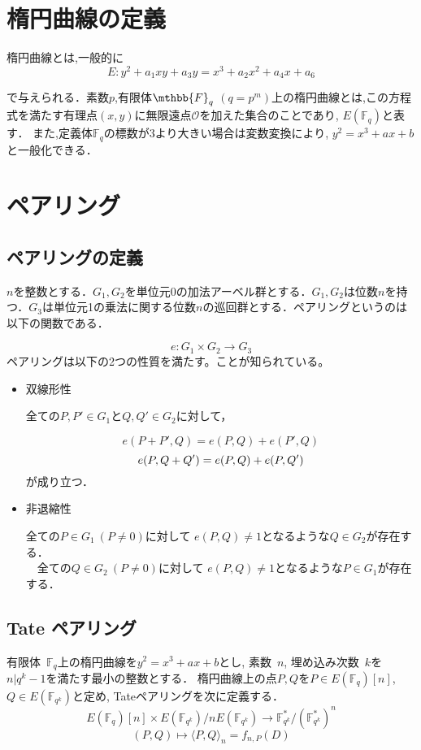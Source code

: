 \documentclass[twocolumn]{jsarticle} %
\begin{document}
\section{楕円曲線の定義}
楕円曲線とは,一般的に
\vspace{-2mm}
\[
E:y^2+a_1xy+a_3y=x^3+a_2x^2+a_4x+a_6
\]

で与えられる．素数$p$,有限体$\mthbb {F}_q$ $(q=p^m)$上の楕円曲線とは,この方程式を満たす有理点$(x,y)$に無限遠点$\mathcal{O}$を加えた集合のことであり, $E(\mathbb {F}_q)$と表す． また,定義体$\mathbb {F}_q$の標数が3より大きい場合は変数変換により, $y^2=x^3+ax+b$と一般化できる．
\section{ペアリング}

\subsection{ペアリングの定義}
$n$を整数とする．$G_1,G_2$を単位元0の加法アーベル群とする．$G_1,G_2$は位数$n$を持つ．$G_3$は単位元1の乗法に関する位数$n$の巡回群とする．ペアリングというのは以下の関数である．

\[
e:G_1\times G_2\longrightarrow G_3
\]
ペアリングは以下の2つの性質を満たす。ことが知られている。\\
\begin{itemize}
\item 双線形性

全ての$P,P' \in G_{1}$と$Q,Q' \in G_{2}$に対して，

\[
e(P+P',Q) = e(P,Q) + e(P',Q)
\]
\[
e(P,Q+Q') = e(P,Q) + e(P,Q') \\
\]
が成り立つ．\\
\vspace{-1zh}
\item 非退縮性

全ての$P \in G_{1} \ (P \not= 0)$に対して $e(P,Q) \not= 1$となるような$Q \in G_{2}$が存在する．\\
　全ての$Q \in G_{2} \ (P \not= 0)$に対して $e(P,Q) \not= 1$となるような$P \in G_{1}$が存在する．
\end{itemize}

\subsection{Tate ペアリング}
有限体\ $\mathbb{F}_q$上の楕円曲線を$y^2=x^3+ax+b$とし, 素数\ $n$, 埋め込み次数\ $k$を$n|q^k-1$を満たす最小の整数とする． 楕円曲線上の点$P,Q$を$P\in E(\mathbb{F}_q)[n]$,\ $Q\in E(\mathbb{F}_{q^k})$と定め, Tateペアリングを次に定義する．
\vspace{2mm}
\[
E(\mathbb{F}_q)[n]\times E(\mathbb{F}_{q^k})/nE(\mathbb{F}_{q^k})\rightarrow \mathbb{F}_{q^k}^{*}/(\mathbb{F}_{q^k}^{*})^n
\]
\vspace{-6mm}
\[(P,Q) \mapsto \langle P, Q \rangle _n = f_{n,P}(D)\]
\end{document}
